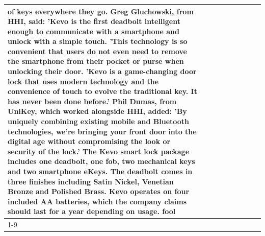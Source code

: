 \begin{table}[H]
\begin{tabular}{lllrlllll}
of keys everywhere they go. Greg Gluchowski, from HHI, said: 'Kevo is the first deadbolt intelligent enough to communicate with a smartphone and unlock with a simple touch. 'This technology is so convenient that users do not even need to remove the smartphone from their pocket or purse when unlocking their door. 'Kevo is a game-changing door lock that uses modern technology and the convenience of touch to evolve the traditional key. It has never been done before.' Phil Dumas, from UniKey, which worked alongside HHI, added: 'By uniquely combining existing mobile and Bluetooth technologies, we’re bringing your front door into the digital age without compromising the look or security of the lock.' The Kevo smart lock package includes one deadbolt, one fob, two mechanical keys and two smartphone eKeys. The deadbolt comes in three finishes including Satin Nickel, Venetian Bronze and Polished Brass. Kevo operates on four included AA batteries, which the company claims should last for a year depending on usage. fool \\
\cline{1-9}

\end{tabular}
\end{table}
